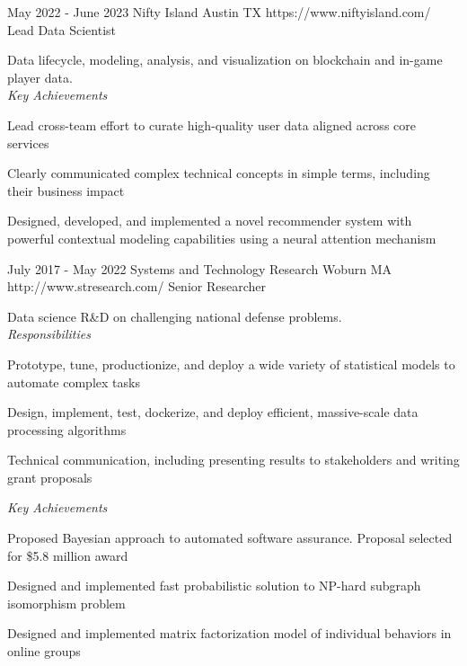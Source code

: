 \documentclass[10pt]{article}
\begin{document}
	\job %
		{May 2022 - June 2023}
		{Nifty Island}
		{Austin TX}
		{https://www.niftyisland.com/}
		{Lead Data Scientist}
		{Data lifecycle, modeling, analysis, and visualization on blockchain and in-game player data.\\

		\vspace{-7pt}
		\textit{Key Achievements}
		\begin{itemize-noindent}
			\vspace{7pt}
			\item Lead cross-team effort to curate high-quality user data aligned across core services
			\item Clearly communicated complex technical concepts in simple terms, including their business impact
			\item Designed, developed, and implemented a novel recommender system with powerful contextual modeling capabilities using a neural attention mechanism
		\end{itemize-noindent}}

	\job %
		{July 2017 - May 2022}
		{Systems and Technology Research}
		{Woburn MA}
		{http://www.stresearch.com/}
		{Senior Researcher}
		{Data science R\&D on challenging national defense problems. \\

		\vspace{-7pt}
		\textit{Responsibilities}
		\begin{itemize-noindent}
			\vspace{7pt}
			\item Prototype, tune, productionize, and deploy a wide variety of statistical models to automate complex tasks
			\item Design, implement, test, dockerize, and deploy efficient, massive-scale data processing algorithms
			\item Technical communication, including presenting results to stakeholders and writing grant proposals
		\end{itemize-noindent}

		\textit{Key Achievements}
		\begin{itemize-noindent}
			\vspace{7pt}
			\item Proposed Bayesian approach to automated software assurance. Proposal selected for \$5.8 million award
			\item Designed and implemented fast probabilistic solution to NP-hard subgraph isomorphism problem
			\item Designed and implemented matrix factorization model of individual behaviors in online groups
		\end{itemize-noindent}}
\end{document}
